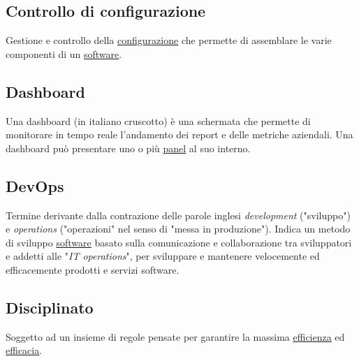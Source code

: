 	\subsection{Controllo di configurazione}
	\label{sec:controlloconfigurazione}
	Gestione e controllo della \underline{\hyperref[sec:configurazione]{configurazione}} che permette di assemblare le varie componenti di un \underline{\hyperref[sec:prodottosoftware]{software}}.\newpage

	

	\subsection{Dashboard}
	\label{sec:dashboard}
	Una dashboard (in italiano cruscotto) è una schermata che permette di monitorare in tempo reale l’andamento dei report e delle metriche aziendali. Una dashboard può presentare uno o più \underline{\hyperref[sec:panel]{panel}} al suo interno.
	
	\subsection{DevOps}
	\label{sec:devops}
	Termine derivante dalla contrazione delle parole inglesi \emph{development} ("sviluppo") e \emph{operations} ("operazioni" nel senso di "messa in produzione"). Indica un metodo di sviluppo \underline{\hyperref[sec:prodottosoftware]{software}} basato sulla comunicazione e collaborazione tra sviluppatori e addetti alle "\emph{IT operations}", per sviluppare e mantenere velocemente ed efficacemente prodotti e servizi software.
	
	
	\subsection{Disciplinato}
	\label{sec:disciplinato}
	Soggetto ad un insieme di regole pensate per garantire la massima \underline{\hyperref[sec:efficienza]{efficienza}} ed \underline{\hyperref[sec:efficacia]{efficacia}}.\newpage

	
